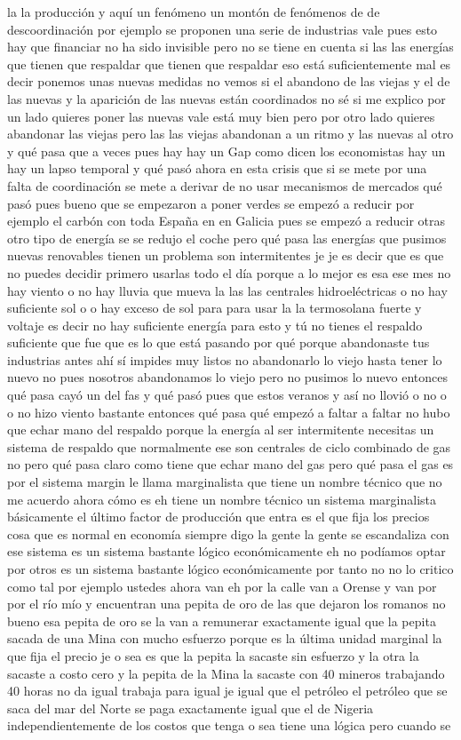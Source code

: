la la producción y aquí un fenómeno un montón de fenómenos de de descoordinación por ejemplo se proponen una serie de industrias vale pues esto hay que financiar no ha sido invisible pero no se tiene en cuenta si las las energías que tienen que respaldar que tienen que respaldar eso está suficientemente mal es decir ponemos unas nuevas medidas no vemos si el abandono de las viejas y el de las nuevas y la aparición de las nuevas están coordinados no sé si me explico por un lado quieres poner las nuevas vale está muy bien pero por otro lado quieres abandonar las viejas pero las las viejas abandonan a un ritmo y las nuevas al otro y qué pasa que a veces pues hay hay un Gap como dicen los economistas hay un hay un lapso temporal y qué pasó ahora en esta crisis que si se mete por una falta de coordinación se mete a derivar de no usar mecanismos de mercados qué pasó pues bueno que se empezaron a poner verdes se empezó a reducir por ejemplo el carbón con toda España en en Galicia pues se empezó a reducir otras otro tipo de energía se se redujo el coche pero qué pasa las energías que pusimos nuevas renovables tienen un problema son intermitentes je je es decir que es que no puedes decidir primero usarlas todo el día porque a lo mejor es esa ese mes no hay viento o no hay lluvia que mueva la las las centrales hidroeléctricas o no hay suficiente sol o o hay exceso de sol para para usar la la termosolana fuerte y voltaje es decir no hay suficiente energía para esto y tú no tienes el respaldo suficiente que fue que es lo que está pasando por qué porque abandonaste tus industrias antes ahí sí impides muy listos no abandonarlo lo viejo hasta tener lo nuevo no pues nosotros abandonamos lo viejo pero no pusimos lo nuevo entonces qué pasa cayó un del fas y qué pasó pues que estos veranos y así no llovió o no o o no hizo viento bastante entonces qué pasa qué empezó a faltar a faltar no hubo que echar mano del respaldo porque la energía al ser intermitente necesitas un sistema de respaldo que normalmente ese son centrales de ciclo combinado de gas no pero qué pasa claro como tiene que echar mano del gas pero qué pasa el gas es por el sistema margin le llama marginalista que tiene un nombre técnico que no me acuerdo ahora cómo es eh tiene un nombre técnico un sistema marginalista básicamente el último factor de producción que entra es el que fija los precios cosa que es normal en economía siempre digo la gente la gente se escandaliza con ese sistema es un sistema bastante lógico económicamente eh no podíamos optar por otros es un sistema bastante lógico económicamente por tanto no no lo critico como tal por ejemplo ustedes ahora van eh por la calle van a Orense y van por por el río mío y encuentran una pepita de oro de las que dejaron los romanos no bueno esa pepita de oro se la van a remunerar exactamente igual que la pepita sacada de una Mina con mucho esfuerzo porque es la última unidad marginal la que fija el precio je o sea es que la pepita la sacaste sin esfuerzo y la otra la sacaste a costo cero y la pepita de la Mina la sacaste con 40 mineros trabajando 40 horas no da igual trabaja para igual je igual que el petróleo el petróleo que se saca del mar del Norte se paga exactamente igual que el de Nigeria independientemente de los costos que tenga o sea tiene una lógica pero cuando se 